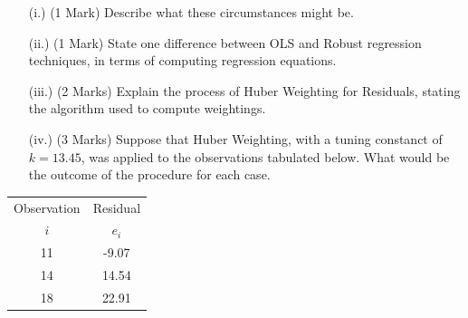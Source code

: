 \documentclass[a4paper,12pt]{article}
\begin{document}
\begin{itemize}
	\item[(i.)] (1 Mark) Describe what these circumstances might be.
	\item[(ii.)] (1 Mark) State one difference between OLS and Robust regression techniques, in terms of computing regression equations.
	\item[(iii.)] (2 Marks) Explain the process of Huber Weighting for Residuals, stating the algorithm used to compute weightings.
	\item[(iv.)] (3 Marks) Suppose that Huber Weighting, with a tuning constanct of $k=13.45$, was applied to the observations 
	tabulated below. What would be the outcome of the procedure for each case. 
\end{itemize}
\begin{center}
	\begin{tabular}{|c|c|}
		\hline
		Observation & Residual \\ 
		$i$  & $e_i$ \\ \hline
		11 & -9.07 \\ \hline 
		14 & 14.54 \\ \hline
		18 & 22.91 \\ \hline
	\end{tabular} 
\end{center}
\end{document}
